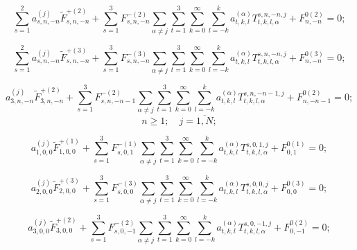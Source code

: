 \begin{equation}
\sum _{s=1}^2 a_{s,n,-n}^{(j)}{\tilde F}_{s,n,-n}^{+(2)}+\sum_{s=1}^3 F_{s,n,-n}^{-(2)}\sum _{\alpha\neq j} \sum _{t=1}^3 \sum _{k=0}^{\infty}\sum_{l=-k}^k a_{t,k,l}^{(\alpha)} T_{t,k,l,\alpha}^{s,n,-n,j}+F_{n,-n}^{0(2)}=0;
\label{eq:13:5}
\end{equation}

\begin{equation}
\sum _{s=1}^2 a_{s,n,-n}^{(j)}{\tilde F}_{s,n,-n}^{+(3)}+\sum_{s=1}^3 F_{s,n,-n}^{-(3)}\sum _{\alpha\neq j} \sum _{t=1}^3 \sum _{k=0}^{\infty}\sum_{l=-k}^k a_{t,k,l}^{(\alpha)} T_{t,k,l,\alpha}^{s,n,-n,j}+F_{n,-n}^{0(3)}=0;
\label{eq:13:6}
\end{equation}

\begin{equation}
a_{3,n,-n}^{(j)}{\tilde F}_{3,n,-n}^{+(2)}+\sum_{s=1}^3 F_{s,n,-n-1}^{-(2)}\sum _{\alpha\neq j} \sum _{t=1}^3 \sum _{k=0}^{\infty}\sum_{l=-k}^k a_{t,k,l}^{(\alpha)} T_{t,k,l,\alpha}^{s,n,-n-1,j}+F_{n,-n-1}^{0(2)}=0;
\label{eq:13:7}
\end{equation}
$$
n\ge 1;\quad j=\overline{1,N};
$$

\begin{equation}
a_{1,0,0}^{(j)}{\tilde F}_{1,0,0}^{+(1)}+\sum_{s=1}^3 F_{s,0,1}^{-(1)}\sum _{\alpha\neq j} \sum _{t=1}^3 \sum _{k=0}^{\infty}\sum_{l=-k}^k a_{t,k,l}^{(\alpha)} T_{t,k,l,\alpha}^{s,0,1,j}+F_{0,1}^{0(1)}=0;
\label{eq:13:8}
\end{equation}

\begin{equation}
a_{2,0,0}^{(j)}{\tilde F}_{2,0,0}^{+(3)}+\sum_{s=1}^3 F_{s,0,0}^{-(3)}\sum _{\alpha\neq j} \sum _{t=1}^3 \sum _{k=0}^{\infty}\sum_{l=-k}^k a_{t,k,l}^{(\alpha)} T_{t,k,l,\alpha}^{s,0,0,j}+F_{0,0}^{0(3)}=0;
\label{eq:13:9}
\end{equation}

\begin{equation}
a_{3,0,0}^{(j)}{\tilde F}_{3,0,0}^{+(2)}+\sum_{s=1}^3 F_{s,0,-1}^{-(2)}\sum _{\alpha\neq j} \sum _{t=1}^3 \sum _{k=0}^{\infty}\sum_{l=-k}^k a_{t,k,l}^{(\alpha)} T_{t,k,l,\alpha}^{s,0,-1,j}+F_{0,-1}^{0(2)}=0;
\label{eq:13:10}
\end{equation}

